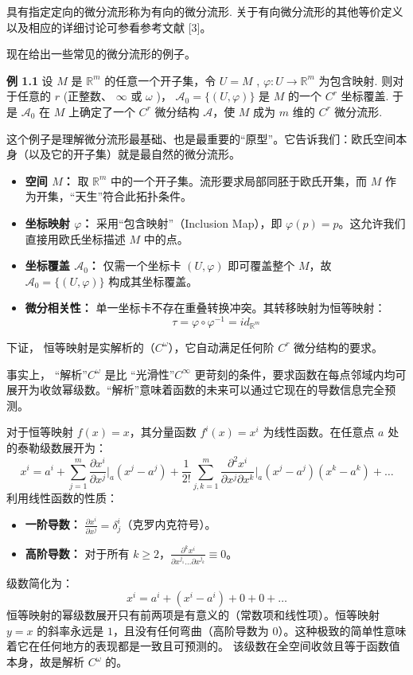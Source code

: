 具有指定定向的微分流形称为有向的微分流形. 关于有向微分流形的其他等价定义以及相应的详细讨论可参看参考文献 [3]。

现在给出一些常见的微分流形的例子。

{\bf 例 1.1} 设  $M$  是  $\mathbb{R}^m$  的任意一个开子集，令  $U = M$ ,  $\varphi: U \to \mathbb{R}^m$  为包含映射. 则对于任意的  $r$  (正整数、 $\infty$  或  $\omega$ )， $\mathcal{A}_0 = \{(U, \varphi)\}$  是  $M$  的一个  $C^r$  坐标覆盖. 于是  $\mathcal{A}_0$  在  $M$  上确定了一个  $C^r$  微分结构  $\mathcal{A}$，使  $M$  成为  $m$  维的  $C^r$  微分流形.

\begin{myremark}[例1.1]
这个例子是理解微分流形最基础、也是最重要的“原型”。它告诉我们：欧氏空间本身（以及它的开子集）就是最自然的微分流形。

\begin{itemize}
    \item \textbf{空间 $M$：} 取 $\mathbb{R}^m$ 中的一个开子集。流形要求局部同胚于欧氏开集，而 $M$ 作为开集，“天生”符合此拓扑条件。
    \item \textbf{坐标映射 $\varphi$：} 采用“包含映射”（Inclusion Map），即 $\varphi(p) = p$。这允许我们直接用欧氏坐标描述 $M$ 中的点。
    \item \textbf{坐标覆盖 $\mathcal{A}_0$：} 仅需一个坐标卡 $(U, \varphi)$ 即可覆盖整个 $M$，故 $\mathcal{A}_0 = \{(U, \varphi)\}$ 构成其坐标覆盖。
    \item \textbf{微分相关性：} 单一坐标卡不存在重叠转换冲突。其转移映射为恒等映射：
    $$ \tau = \varphi \circ \varphi^{-1} = id_{\mathbb{R}^m} \text{} $$
    
\end{itemize}

下证， 恒等映射是实解析的（$C^\omega$），它自动满足任何阶 $C^r$ 微分结构的要求。

事实上， “解析”$C^\omega$ 是比 “光滑性”$C^\infty$ 更苛刻的条件，要求函数在每点邻域内均可展开为收敛幂级数。“解析”意味着函数的未来可以通过它现在的导数信息完全预测。

对于恒等映射 $f(x) = x$，其分量函数 $f^i(x) = x^i$ 为线性函数。在任意点 $a$ 处的泰勒级数展开为：
$$ x^i = a^i + \sum_{j=1}^m \frac{\partial x^i}{\partial x^j}\Big|_a (x^j - a^j) + \frac{1}{2!} \sum_{j,k=1}^m \frac{\partial^2 x^i}{\partial x^j \partial x^k}\Big|_a (x^j - a^j)(x^k - a^k) + \dots $$
利用线性函数的性质：
\begin{itemize}
    \item \textbf{一阶导数：} $\frac{\partial x^i}{\partial x^j} = \delta_j^i$（克罗内克符号）。
    \item \textbf{高阶导数：} 对于所有 $k \ge 2$，$\frac{\partial^k x^i}{\partial x^{j_1} \dots \partial x^{j_k}} \equiv 0$。
\end{itemize}
级数简化为：
$$ x^i = a^i + (x^i - a^i) + 0 + 0 + \dots $$
恒等映射的幂级数展开只有前两项是有意义的（常数项和线性项）。恒等映射 $y=x$ 的斜率永远是 $1$，且没有任何弯曲（高阶导数为 $0$）。这种极致的简单性意味着它在任何地方的表现都是一致且可预测的。
该级数在全空间收敛且等于函数值本身，故是解析 $C^\omega$ 的。


\end{myremark}
